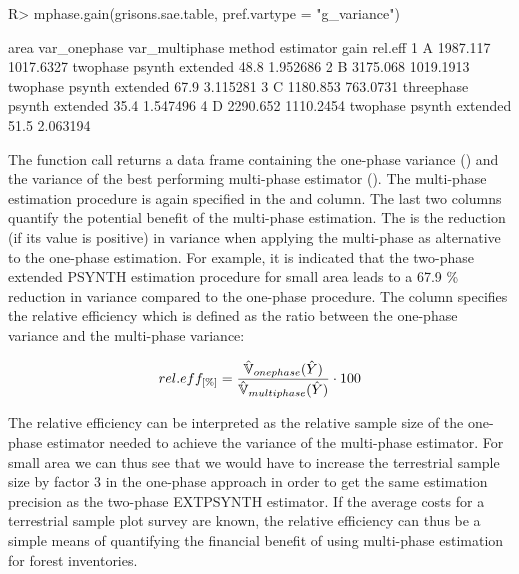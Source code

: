 \begin{small}
\begin{Schunk}
\begin{Sinput}
R> mphase.gain(grisons.sae.table, pref.vartype = "g_variance")
\end{Sinput}
\begin{Soutput}
  area var_onephase var_multiphase     method       estimator gain  rel.eff
1    A     1987.117      1017.6327   twophase psynth extended 48.8 1.952686
2    B     3175.068      1019.1913   twophase psynth extended 67.9 3.115281
3    C     1180.853       763.0731 threephase psynth extended 35.4 1.547496
4    D     2290.652      1110.2454   twophase psynth extended 51.5 2.063194
\end{Soutput}
\end{Schunk}
\end{small}

The function call returns a data frame containing the one-phase variance () and the variance of the best performing multi-phase estimator (). The multi-phase estimation procedure is again specified in the  and  column. The last two columns quantify the potential benefit of the multi-phase estimation. The  is the reduction (if its value is positive) in variance when applying the multi-phase as alternative to the one-phase estimation. For example, it is indicated that the two-phase extended PSYNTH estimation procedure for small area  leads to a 67.9 \% reduction in variance compared to the one-phase procedure. The column  specifies the relative efficiency which is defined as the ratio between the one-phase variance and the multi-phase variance:

\begin{equation}\label{eq:releff}
  rel.eff_{[\%]}=\frac{\hat{\mathbb{V}}_{onephase}(\hat{Y})}{\hat{\mathbb{V}}_{multiphase}(\hat{Y})}\cdot100
  \end{equation}

The relative efficiency can be interpreted as the relative sample size of the one-phase estimator needed to achieve the variance of the multi-phase estimator. For small area  we can thus see that we would have to increase the terrestrial sample size by factor 3 in the one-phase approach in order to get the same estimation precision as the two-phase EXTPSYNTH estimator. If the average costs for a terrestrial sample plot survey are known, the relative efficiency can thus be a simple means of quantifying the financial benefit of using multi-phase estimation for forest inventories.


